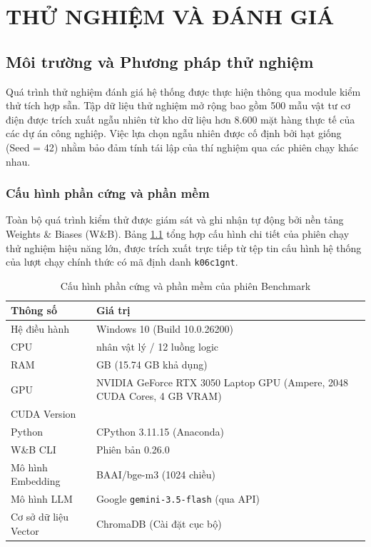 \chapter{THỬ NGHIỆM VÀ ĐÁNH GIÁ}
\label{ch:chuong4}

\section{Môi trường và Phương pháp thử nghiệm}

Quá trình thử nghiệm đánh giá hệ thống được thực hiện thông qua module kiểm thử tích hợp sẵn. Tập dữ liệu thử nghiệm mở rộng bao gồm 500 mẫu vật tư cơ điện được trích xuất ngẫu nhiên từ kho dữ liệu hơn 8.600 mặt hàng thực tế của các dự án công nghiệp. Việc lựa chọn ngẫu nhiên được cố định bởi hạt giống (Seed = 42) nhằm bảo đảm tính tái lập của thí nghiệm qua các phiên chạy khác nhau.

\subsection{Cấu hình phần cứng và phần mềm}

Toàn bộ quá trình kiểm thử được giám sát và ghi nhận tự động bởi nền tảng Weights \& Biases (W\&B). Bảng \ref{tab:hw_config} tổng hợp cấu hình chi tiết của phiên chạy thử nghiệm hiệu năng lớn, được trích xuất trực tiếp từ tệp tin cấu hình hệ thống của lượt chạy chính thức có mã định danh \texttt{k06c1gnt}.

\begin{table}[H]
    \centering
    \caption{Cấu hình phần cứng và phần mềm của phiên Benchmark}
    \begin{tabular}{|>{\raggedright\arraybackslash}p{5cm}|>{\raggedright\arraybackslash}p{9cm}|}
        \hline
        \textbf{Thông số} & \textbf{Giá trị} \\
        \hline
        Hệ điều hành & Windows 10 (Build 10.0.26200) \\
        \hline
        CPU & 6 nhân vật lý / 12 luồng logic \\
        \hline
        RAM & 16 GB (15.74 GB khả dụng) \\
        \hline
        GPU & NVIDIA GeForce RTX 3050 Laptop GPU (Ampere, 2048 CUDA Cores, 4 GB VRAM) \\
        \hline
        CUDA Version & 13.1 \\
        \hline
        Python & CPython 3.11.15 (Anaconda) \\
        \hline
        W\&B CLI & Phiên bản 0.26.0 \\
        \hline
        Mô hình Embedding & BAAI/bge-m3 (1024 chiều) \\
        \hline
        Mô hình LLM & Google \texttt{gemini-3.5-flash} (qua API) \\
        \hline
        Cơ sở dữ liệu Vector & ChromaDB (Cài đặt cục bộ) \\
        \hline
    \end{tabular}
    \label{tab:hw_config}
\end{table}

